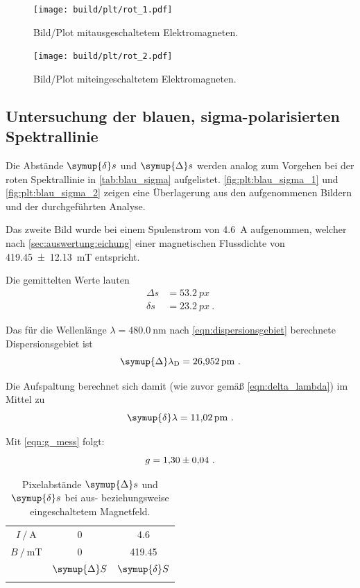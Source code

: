 \begin{figure}[H]
    \centering
    \texttt{[image: build/plt/rot\_1.pdf]}
    \caption{Bild/Plot mitausgeschaltetem Elektromagneten.}
    \label{fig:plt:rot_1}
\end{figure}

\begin{figure}[H]
    \centering
    \texttt{[image: build/plt/rot\_2.pdf]}
    \caption{Bild/Plot miteingeschaltetem Elektromagneten.}
    \label{fig:plt:rot_2}
\end{figure}


\FloatBarrier
\subsection{Untersuchung der blauen, sigma-polarisierten Spektrallinie}
Die Abstände $\symup{\delta} s$ und $\symup{\Delta} s$ werden analog zum Vorgehen bei der roten Spektrallinie
in \autoref{tab:blau_sigma} aufgelistet.
\autoref{fig:plt:blau_sigma_1} und \autoref{fig:plt:blau_sigma_2} zeigen eine Überlagerung
aus den aufgenommenen Bildern und der durchgeführten Analyse.

Das zweite Bild wurde bei einem Spulenstrom von \SI{4.6}{\ampere} aufgenommen,
welcher nach \autoref{sec:auswertung:eichung} einer magnetischen Flussdichte von \SI{419.45 \pm 12.13}{\milli\tesla} entspricht.

Die gemittelten Werte lauten
\begin{align*}
    Δs &= \SI{53.2}{px} \\
    δs &= \SI{23.2}{px} \ .
\end{align*}


Das für die Wellenlänge $\lambda = \SI{480.0}{\nano\meter}$ nach \autoref{eqn:dispersionsgebiet} berechnete Dispersionsgebiet ist
\[
    \symup{\Delta}\lambda_\text{D} = \SI{26.952}{\pico\meter} \ .
\]

Die Aufspaltung berechnet sich damit (wie zuvor gemäß \autoref{eqn:delta_lambda}) im Mittel zu
\[
    \symup{\delta} \lambda = \SI{11.02}{\pico\meter} \ .
\]

Mit \autoref{eqn:g_mess} folgt:
\[
    g = \num{1.30 \pm 0.04} \ .
\]

\begin{table}[H]
    \centering
    \caption{Pixelabstände $\symup{\Delta} s$ und $\symup{\delta} s$ bei aus- beziehungsweise eingeschaltetem Magnetfeld.}
    \label{tab:blau_sigma}
    \begin{tabular}{S S S}
        \toprule
        {$I \mathbin{/} \si{\ampere}$} & 0 & 4.6 \\
        {$B \mathbin{/} \si{\milli\tesla}$} & 0 & 419.45  \\
        \midrule
        & {$\symup{\Delta} S$} & {$\symup{\delta} S$} \\
        \midrule
        \bottomrule
    \end{tabular}
\end{table}

